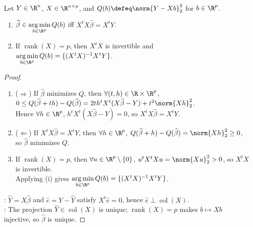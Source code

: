 \begin{theorem} \label{thm:linear-model-normal-equations} \\
Let $Y\in\R^n$, $X\in\R^{n\times p}$, and $Q(b)\defeq\norm{Y-Xb}_2^2$ for $b\in\R^p$.
\begin{enumerate}[label=(\roman*)]
\setlength{\itemsep}{0pt}
\item $\widehat{\beta}\in\operatorname*{arg\,min}\limits_{b\in\R^p}Q(b)$ iff $X^tX\widehat{\beta}=X^tY$.
\item If $\operatorname{rank}(X)=p$, then $X^tX$ is invertible and $\operatorname*{arg\,min}\limits_{b\in\R^p}Q(b)=\{(X^tX)^{-1}X^tY\}$.
\end{enumerate}
\begin{proof}
\begin{enumerate}[label=(\roman*)]
\setlength{\itemsep}{0pt}
\item[$(i)$] ($\Rightarrow$) If $\widehat{\beta}$ minimizes $Q$, then $\forall(t,h)\in\R\times\R^p$, $0\le Q(\widehat{\beta}+th)-Q(\widehat{\beta})=2t h^tX^t(X\widehat{\beta}-Y)+t^2\norm{Xh}_2^2$.\\
Hence $\forall h\in\R^p$, $h^tX^t(X\widehat{\beta}-Y)=0$, so $X^tX\widehat{\beta}=X^tY$.
\item[$(i)$] ($\Leftarrow$) If $X^tX\widehat{\beta}=X^tY$, then $\forall h\in\R^p$, $Q(\widehat{\beta}+h)-Q(\widehat{\beta})=\norm{Xh}_2^2\ge0$, so $\widehat{\beta}$ minimizes $Q$.
\item[$(ii)$] If $\operatorname{rank}(X)=p$, then $\forall u\in\R^p\setminus\{0\}$, $u^tX^tXu=\norm{Xu}_2^2>0$, so $X^tX$ is invertible.\\
Applying (i) gives $\operatorname*{arg\,min}\limits_{b\in\R^p}Q(b)=\{(X^tX)^{-1}X^tY\}$.
\end{enumerate}
: $\widehat{Y}=X\widehat{\beta}$ and $\widehat{e}=Y-\widehat{Y}$ satisfy $X^t\widehat{e}=0$, hence $\widehat{e}\perp\operatorname{col}(X)$.\\
: The projection $\widehat{Y}\in\operatorname{col}(X)$ is unique; $\operatorname{rank}(X)=p$ makes $b\mapsto Xb$ injective, so $\widehat{\beta}$ is unique.
\end{proof}
\end{theorem}

